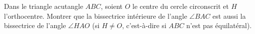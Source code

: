 Dans le triangle acutangle $ABC$, soient $O$ le centre du cercle circonscrit
et $H$ l'orthocentre. Montrer que la bissectrice intérieure de l'angle
$\angle BAC$ est aussi la bissectrice de l'angle $\angle HAO$ (si $H\neq O$,
c'est-à-dire si $ABC$ n'est pas équilatéral).
